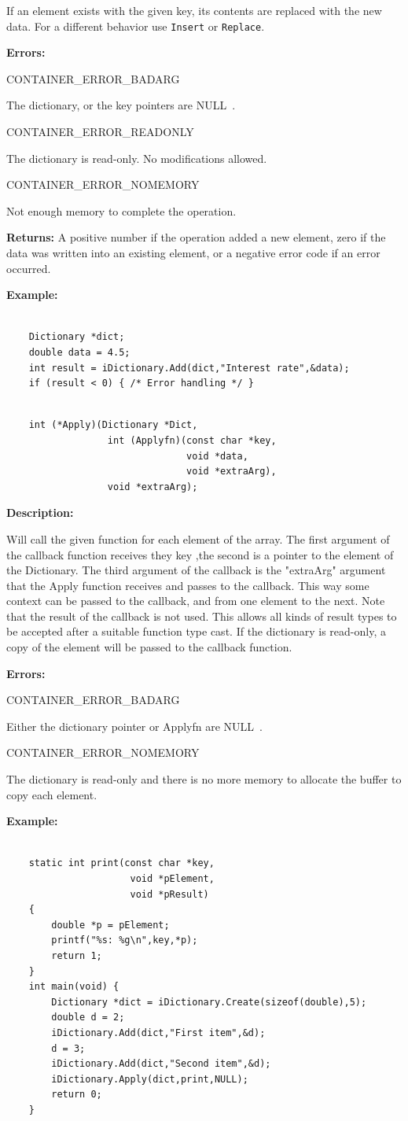 \documentclass[12pt,a4paper]{memoir} %
\newif\iftth
\newcommand{\api}[1] {%
 \iftth\else\Needspace{3\baselineskip}\fi%
\par\vspace{0.4cm}
\addcontentsline{toc}{subsubsection}{#1}
\index{#1!\container}
\addtocounter{apis}{1}
\noindent {\large \textbf{#1}} \hrulefill%
\iftth\else
\nopagebreak
\fi
\begin{verbatim}
}
\newcommand{\container}{}
\newcommand{\apidescription}{%
\par \noindent \textbf{Description:} %\par\noindent
}
\newcommand{\apierrors}{%
\par \noindent \textbf{Errors:}\par\noindent
}
\newcommand{\doerror}[1]{%
\par\noindent
\iftth
{CONTAINER\_ERROR\_#1}
\else
{\footnotesize CONTAINER\_ERROR\_#1}
\fi
}
\newcommand{\Null}{{\iftth \ NULL \else \footnotesize NULL\  \fi}}
\newcommand{\returns}{\par\noindent\textbf{Returns:}}
\newcommand{\example}{
\par\noindent
\textbf{Example:}
\begin{verbatim}
}
\newcounter{apis}
\begin{document}
{{If an element exists with the given key, its contents are replaced with the new data. For a different behavior use \texttt{Insert} or \texttt{Replace}.

\apierrors
\doerror{BADARG} The dictionary, or the key pointers are \Null.
\doerror{READONLY} The dictionary is read-only. No modifications allowed.
\doerror{NOMEMORY} Not enough memory to complete the operation.
\returns
A positive number if the operation added a new element, zero if the data was written into an existing element, or a negative error code if an error occurred.
\example
    Dictionary *dict;
    double data = 4.5;
    int result = iDictionary.Add(dict,"Interest rate",&data);
    if (result < 0) { /* Error handling */ }
\end{verbatim}

\api{Apply}
    int (*Apply)(Dictionary *Dict,
                  int (Applyfn)(const char *key,
                                void *data,
                                void *extraArg),
                  void *extraArg);
\end{verbatim}
\apidescription
Will call the given function for each element of the array. The first argument of the callback function receives they key ,the second is a pointer to the element of the Dictionary. The  third argument of the callback is the "extraArg" argument that the Apply function receives and passes to  the callback. This way some context can be passed to the callback, and from one element to the next.
Note that the result of the callback is not used. This allows all kinds of result types to be accepted after a suitable function type cast.
If the dictionary is read-only, a copy of the element will be passed to the callback function.

\apierrors
\doerror{BADARG}  Either the dictionary pointer or Applyfn are \Null.
\doerror{NOMEMORY} The dictionary is read-only and there is no more memory to allocate the buffer to copy each element.
\example
    static int print(const char *key,
                      void *pElement,
                      void *pResult)
    {
        double *p = pElement;
        printf("%
        return 1;
    }
    int main(void) {
        Dictionary *dict = iDictionary.Create(sizeof(double),5);
        double d = 2;
        iDictionary.Add(dict,"First item",&d);
        d = 3;
        iDictionary.Add(dict,"Second item",&d);
        iDictionary.Apply(dict,print,NULL);
        return 0;
    }
\end{verbatim}

}}
\end{document}

